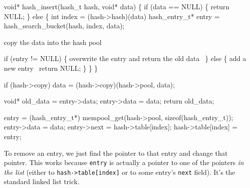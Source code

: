 \nwenddocs{}\plusendmoddef
void* hash_insert(hash_t hash, void* data)
\{
    if (data == NULL) \{
        return NULL;
    \} else \{
        int index = (hash->hash)(data) %
        hash_entry_t* entry = hash_search_bucket(hash, index, data);

        \LA{}copy the data into the hash pool~{\nwtagstyle{}}\RA{}

        if (entry != NULL) \{
            \LA{}overwrite the entry and return the old data~{\nwtagstyle{}}\RA{}
        \} else \{
            \LA{}add a new entry~{\nwtagstyle{}}\RA{}
            return NULL;
        \}
    \}
\}

\nwendcode{}\nwdocspar

\nwenddocs{}\endmoddef
if (hash->copy)
    data = (hash->copy)(hash->pool, data);
\nwendcode{}\nwdocspar

\nwenddocs{}\endmoddef
void* old_data = entry->data;
entry->data = data;
return old_data;
\nwendcode{}\nwdocspar

\nwenddocs{}\endmoddef
entry = (hash_entry_t*) mempool_get(hash->pool, sizeof(hash_entry_t));
entry->data = data;
entry->next = hash->table[index];
hash->table[index] = entry;
\nwendcode{}\nwdocspar

To remove an entry, we just find the pointer to that entry
and change that pointer.  This works because {\tt{}entry} is
actually a pointer to one of the pointers \emph{in the list}
(either to {\tt{}hash->table[index]} or to some entry's {\tt{}next}
field).  It's the standard linked list trick.

